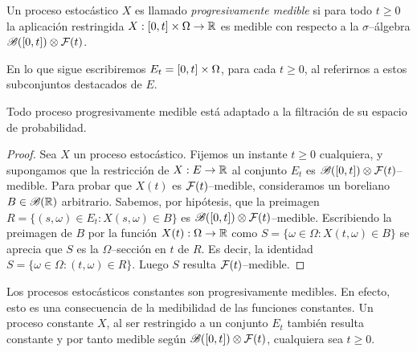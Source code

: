 

\begin{definition}
  Un proceso estocástico \(X\) es llamado \emph{progresivamente medible} si para todo \(t \geq 0\) la aplicación restringida \(X : \interval{cc}{0}{t} \times \Omega \rightarrow \realNumbers\) es medible con respecto a la \(\sigma\)--álgebra \(\mathscr{B}([0, t]) \otimes \mathcal{F}(t)\).
\end{definition}

En lo que sigue escribiremos \(E_t = \interval{cc}{0}{t} \times \Omega\), para cada \(t \geq 0\), al referirnos a estos subconjuntos destacados de \(E\).

\begin{lemma}
  Todo proceso progresivamente medible está adaptado a la filtración de su espacio de probabilidad.
\end{lemma}


\begin{proof}
  Sea \(X\) un proceso estocástico.
  Fijemos un instante \(t \geq 0\) cualquiera, y supongamos que la restricción de \(X : E \rightarrow \mathbb{R}\) al conjunto \(E_t\) es \(\borel(\interval{cc}{0}{t}) \otimes \events(t)\)--medible.
  Para probar que \(X(t)\) es \(\mathcal{F}(t)\)--medible, consideramos un boreliano \(B \in \mathscr{B}(\mathbb{R})\) arbitrario.
  Sabemos, por hipótesis, que la preimagen \(R = \{(s, \omega) \in E_t : X(s, \omega) \in B\}\) es \(\borel(\interval{cc}{0}{t}) \otimes \events(t)\)--medible.
  Escribiendo la preimagen de \(B\) por la función  \(X(t) : \Omega \rightarrow \mathbb{R}\) como \(S = \{\omega \in \Omega : X(t, \omega) \in B\}\) se aprecia que \(S\) es la \(\Omega\)--sección en \(t\) de \(R\).
  Es decir, la identidad \(S = \{\omega \in \Omega : (t, \omega) \in R\}\).
  Luego \(S\) resulta \(\mathcal{F}(t)\)--medible.
\end{proof}

\begin{example}
  Los procesos estocásticos constantes son progresivamente medibles.
  En efecto, esto es una consecuencia de la medibilidad de las funciones constantes.
  Un proceso constante \(X\), al ser restringido a un conjunto \(E_t\) también resulta constante y por tanto medible según \(\borel(\interval{cc}{0}{t}) \otimes \events(t)\), cualquiera sea \(t \geq 0\).
\end{example}

